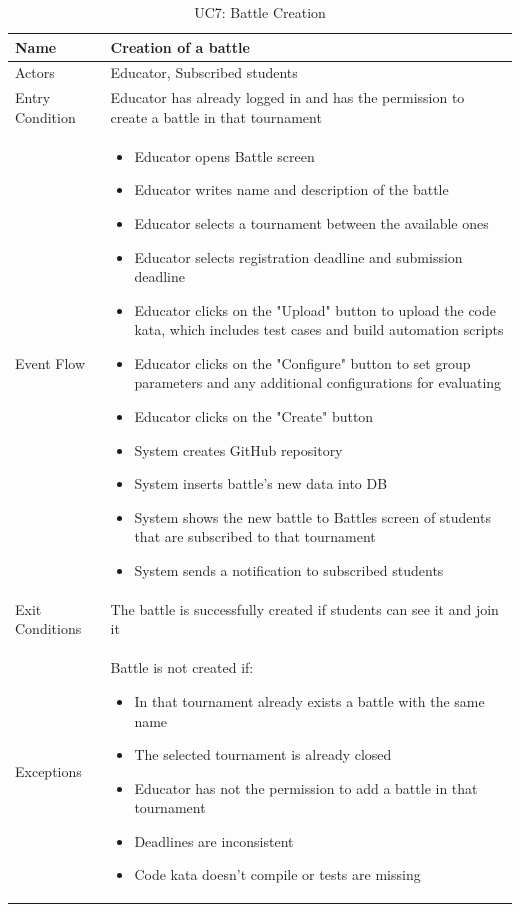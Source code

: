 \begin{enumerate}
   \begin{table}[H]
       \centering
       \begin{tabular}{|l|m{11cm}|}
        \hline
            Name & Creation of a battle\\
        \hline
            Actors & Educator, Subscribed students\\
        \hline
            Entry Condition & Educator has already logged in and has the permission to create a battle in that tournament\\
        \hline
            Event Flow & 
            \begin{itemize}
                \item Educator opens Battle screen
                \item Educator writes name and description of the battle
                \item Educator selects a tournament between the available ones
                \item Educator selects registration deadline and submission deadline 
                \item Educator clicks on the "Upload" button to upload the code kata, which includes test cases and build automation scripts
                \item Educator clicks on the "Configure" button to set group parameters and any additional configurations for evaluating
                \item Educator clicks on the "Create" button                
                \item System creates GitHub repository            
                \item System inserts battle's new data into DB
                \item System shows the new battle to Battles screen of students that are subscribed to that tournament 
                \item System sends a notification to subscribed students
            \end{itemize}\\
        \hline
            Exit Conditions & The battle is successfully created if students can see it and join it\\
        \hline
            Exceptions & Battle is not created if: 
            \begin{itemize}
                \item In that tournament already exists a battle with the same name
                \item The selected tournament is already closed
                \item Educator has not the permission to add a battle in that tournament
                \item Deadlines are inconsistent
                \item Code kata doesn't compile or tests are missing
            \end{itemize}\\
        \hline
       \end{tabular}
       \caption{UC7: Battle Creation}
       \label{tab:uc7}
   \end{table}


\end{enumerate}
